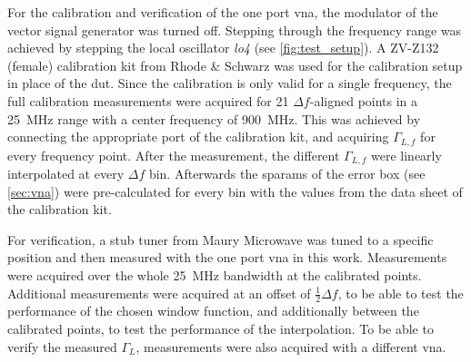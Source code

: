 \documentclass[12pt,a4paper,parskip=full,abstract=true,BCOR=12mm,twoside,open=right]{scrreprt}
\def\device#1{\textit{#1}}
\begin{document}
For the calibration and verification of the one port \gls{vna}, the modulator of
the vector signal generator was turned off. Stepping through the frequency range
was achieved by stepping the local oscillator \device{lo4} (see \cref{fig:test_setup}).
A ZV-Z132 (female) calibration kit from Rhode \& Schwarz was used for the calibration
setup in place of the \gls{dut}. Since the calibration is only valid for a single frequency, the full
calibration measurements were acquired for 21 $\Delta{}f$-aligned points in a
\SI{25}{\mega\hertz} range with a center frequency of \SI{900}{\mega\hertz}. This
was achieved by connecting the appropriate port of the calibration kit, and acquiring
$\Gamma_{L,f}$ for every frequency point. After the measurement, the different $\Gamma_{L,f}$ were linearly
interpolated at every $\Delta{}f$ bin. Afterwards the \glspl{sparam} of
the error box (see \cref{sec:vna}) were pre-calculated for every bin with the values
from the data sheet of the calibration kit\cite{zv-z132}.

For verification, a stub tuner from Maury Microwave was tuned to a specific position and
then measured with the one port \gls{vna} in this work. Measurements were acquired over
the whole \SI{25}{\mega\hertz} bandwidth at the calibrated points. Additional measurements
were acquired at an offset of $\frac{1}{2}\Delta{}f$, to be able to test the performance
of the chosen window function, and additionally between the calibrated points, to test the
performance of the interpolation. To be able to verify the measured $\Gamma_L$, measurements
were also acquired with a different \gls{vna}.
\end{document}
